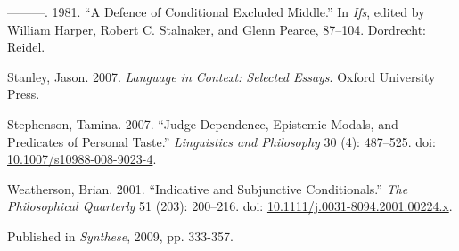 \documentclass[
  10pt,
  letterpaper,
  DIV=11,
  numbers=noendperiod,
  twoside]{scrartcl}
\newlength{\cslhangindent}
\newenvironment{CSLReferences}[2] %
 {\begin{list}{}{%
  \setlength{\itemindent}{0pt}
  \setlength{\leftmargin}{0pt}
  \setlength{\parsep}{0pt}
  \ifodd #1
   \setlength{\leftmargin}{\cslhangindent}
   \setlength{\itemindent}{-1\cslhangindent}
  \fi
  \setlength{\itemsep}{#2\baselineskip}}}
 {\end{list}}
\begin{document}
\begin{CSLReferences}{1}{0}
---------. 1981. {``A Defence of Conditional Excluded Middle.''} In
\emph{Ifs}, edited by William Harper, Robert C. Stalnaker, and Glenn
Pearce, 87--104. Dordrecht: Reidel.

Stanley, Jason. 2007. \emph{{Language in Context: Selected Essays}}.
Oxford University Press.

Stephenson, Tamina. 2007. {``Judge Dependence, Epistemic Modals, and
Predicates of Personal Taste.''} \emph{Linguistics and Philosophy} 30
(4): 487--525. doi:
\href{https://doi.org/10.1007/s10988-008-9023-4}{10.1007/s10988-008-9023-4}.

Weatherson, Brian. 2001. {``{Indicative and Subjunctive
Conditionals}.''} \emph{The Philosophical Quarterly} 51 (203): 200--216.
doi:
\href{https://doi.org/10.1111/j.0031-8094.2001.00224.x}{10.1111/j.0031-8094.2001.00224.x}.

\end{CSLReferences}



\noindent Published in\emph{
Synthese}, 2009, pp. 333-357.
\end{document}
